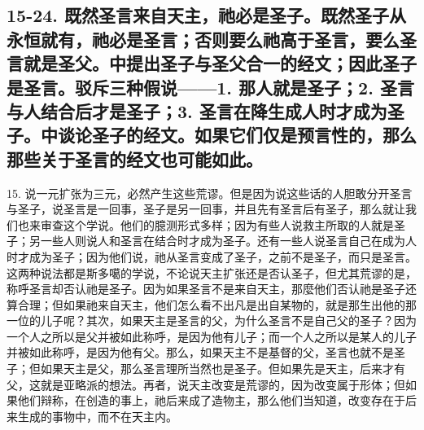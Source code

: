 
\subsection{15-24. 既然圣言来自天主，祂必是圣子。既然圣子从永恒就有，祂必是圣言；否则要么祂高于圣言，要么圣言就是圣父。中提出圣子与圣父合一的经文；因此圣子是圣言。驳斥三种假说——1. 那人就是圣子；2. 圣言与人结合后才是圣子；3. 圣言在降生成人时才成为圣子。中谈论圣子的经文。如果它们仅是预言性的，那么那些关于圣言的经文也可能如此。}

15. 说一元扩张为三元，必然产生这些荒谬。但是因为说这些话的人胆敢分开圣言与圣子，说圣言是一回事，圣子是另一回事，并且先有圣言后有圣子，那么就让我们也来审查这个学说。他们的臆测形式多样；因为有些人说救主所取的人就是圣子；另一些人则说人和圣言在结合时才成为圣子。还有一些人说圣言自己在成为人时才成为圣子；因为他们说，祂从圣言变成了圣子，之前不是圣子，而只是圣言。这两种说法都是斯多噶的学说，不论说天主扩张还是否认圣子，但尤其荒谬的是，称呼圣言却否认祂是圣子。因为如果圣言不是来自天主，那麼他们否认祂是圣子还算合理；但如果祂来自天主，他们怎么看不出凡是出自某物的，就是那生出他的那一位的儿子呢？其次，如果天主是圣言的父，为什么圣言不是自己父的圣子？因为一个人之所以是父并被如此称呼，是因为他有儿子；而一个人之所以是某人的儿子并被如此称呼，是因为他有父。那么，如果天主不是基督的父，圣言也就不是圣子；但如果天主是父，那么圣言理所当然也是圣子。但如果先是天主，后来才有父，这就是亚略派的想法。再者，说天主改变是荒谬的，因为改变属于形体；但如果他们辩称，在创造的事上，祂后来成了造物主，那么他们当知道，改变存在于后来生成的事物中，而不在天主内。\par

